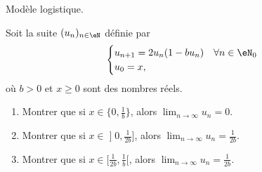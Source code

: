 
\begin{exercice}\label{exoTD3-0012}

	Modèle logistique.

	Soit la suite $(u_n)_{n\in\eN}$ définie par
	\begin{equation}
		\begin{cases}
			u_{n+1}=2u_n(1-bu_n)	&	\text{$\forall n\in\eN_0$}\\
			u_0=x,
		\end{cases}
	\end{equation}
	où $b>0$ et $x\geq 0$ sont des nombres réels.
	\begin{enumerate}
		\item
			Montrer que si $x\in\{ 0,\frac{1}{ b } \}$, alors $\lim_{n\to\infty}u_n=0$.
		\item
			Montrer que si $x\in\mathopen] 0 , \frac{1}{ 2b } \mathclose]$, alors $\lim_{n\to\infty}u_n=\frac{1}{ 2b }$.
		\item
			Montrer que si $x\in\mathopen[ \frac{1}{ 2b } , \frac{1}{ b } [$, alors $\lim_{n\to\infty}u_n=\frac{1}{ 2b }$.
	\end{enumerate}

\end{exercice}
